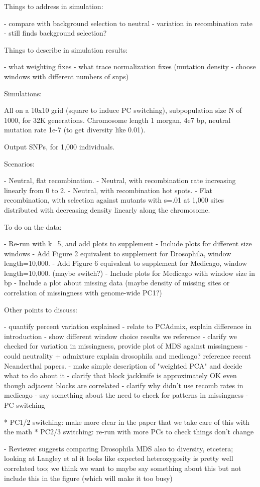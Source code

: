 Things to address in simulation:

- compare with background selection to neutral
- variation in recombination rate - still finds background selection?

Things to describe in simulation results:

- what weighting fixes
- what trace normalization fixes 
    (mutation density - choose windows with different numbers of snps)

Simulations:

All on a 10x10 grid (square to induce PC switching),
subpopulation size N of 1000, for 32K generations.
Chromosome length 1 morgan, 4e7 bp, neutral mutation rate 1e-7 (to get diversity like 0.01).

Output SNPs, for 1,000 individuals.

Scenarios:

- Neutral, flat recombination.
- Neutral, with recombination rate increasing linearly from 0 to 2.
- Neutral, with recombination hot spots.
- Flat recombination, with selection against mutants with s=.01 at 1,000 sites
    distributed with decreasing density linearly along the chromosome.


To do on the data:

- Re-run with k=5, and add plots to supplement
- Include plots for different size windows
- Add Figure 2 equivalent to supplement for Drosophila, window length=10,000.
- Add Figure 6 equivalent to supplement for Medicago, window length=10,000. (maybe switch?)
- Include plots for Medicago with window size in bp
- Include a plot about missing data 
    (maybe density of missing sites or correlation of missingness with genome-wide PC1?)


Other points to discuss:

- quantify percent variation explained
- relate to PCAdmix, explain difference in introduction
- show different window choice results we reference
- clarify we checked for variation in missingness, provide plot of MDS against missingness
- could neutrality + admixture explain drosophila and medicago? reference recent Neanderthal papers.
- make simple description of "weighted PCA" and decide what to do about it 
- clarify that block jackknife is approximately OK even though adjacent blocks are correlated
- clarify why didn't use recomb rates in medicago
- say something about the need to check for patterns in missingness
- PC switching

    * PC1/2 switching: make more clear in the paper that we take care of this with the math
    * PC2/3 switching: re-run with more PCs to check things don't change

- Reviewer suggests comparing Drosophila MDS also to diversity, etcetera;
    looking at Langley et al it looks like expected heterozygosity is pretty well correlated too;
    we think we want to maybe say something about this but not include this in the figure
    (which will make it too busy)

